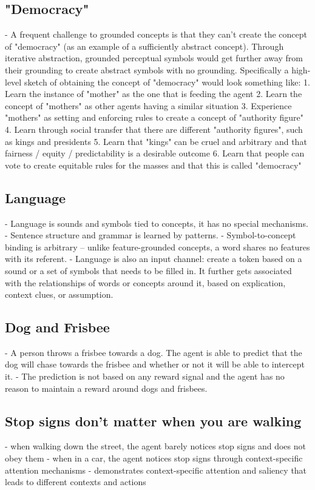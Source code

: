 \documentclass{article}
\begin{document}
\subsection{"Democracy"}
- A frequent challenge to grounded concepts is that they can't create the concept of "democracy" (as an example of a sufficiently abstract concept). Through iterative abstraction, grounded perceptual symbols would get further away from their grounding to create abstract symbols with no grounding. Specifically a high-level sketch of obtaining the concept of "democracy" would look something like:
	1. Learn the instance of "mother" as the one that is feeding the agent
	2. Learn the concept of "mothers" as other agents having a similar situation
	3. Experience "mothers" as setting and enforcing rules to create a concept of "authority figure"
	4. Learn through social transfer that there are different "authority figures", such as kings and presidents
	5. Learn that "kings" can be cruel and arbitrary and that fairness / equity / predictability is a desirable outcome
	6. Learn that people can vote to create equitable rules for the masses and that this is called "democracy"
    
\subsection{Language}
- Language is sounds and symbols tied to concepts, it has no special mechanisms.
- Sentence structure and grammar is learned by patterns.
- Symbol-to-concept binding is arbitrary – unlike feature-grounded concepts, a word shares no features with its referent.
- Language is also an input channel: create a token based on a sound or a set of symbols that needs to be filled in. It further gets associated with the relationships of words or concepts around it, based on explication, context clues, or assumption.
\subsection{Dog and Frisbee}
- A person throws a frisbee towards a dog. The agent is able to predict that the dog will chase towards the frisbee and whether or not it will be able to intercept it. 
- The prediction is not based on any reward signal and the agent has no reason to maintain a reward around dogs and frisbees.

\subsection{Stop signs don't matter when you are walking}
- when walking down the street, the agent barely notices stop signs and does not obey them
- when in a car, the agent notices stop signs through context-specific attention mechanisms
- demonstrates context-specific attention and saliency that leads to different contexts and actions
\end{document}
